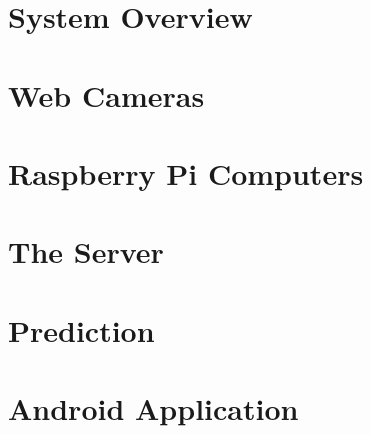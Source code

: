 \section{System Overview}


\section{Web Cameras}


\section{Raspberry Pi Computers}


\section{The Server}


\section{Prediction}


\section{Android Application}
